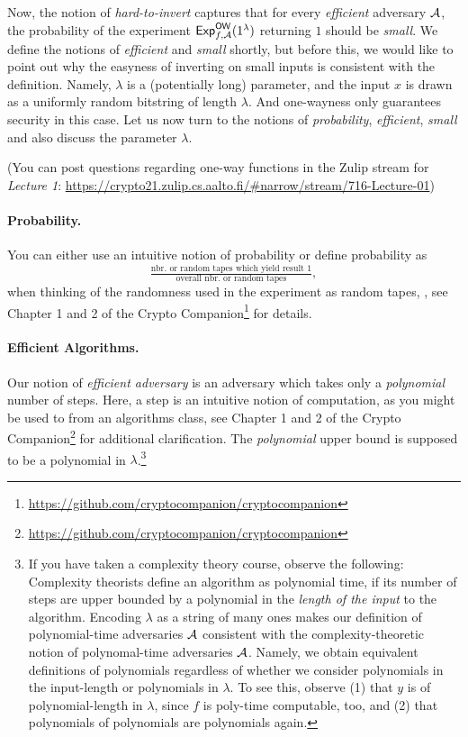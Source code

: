 \documentclass[a4paper,table,dvipsnames]{article}
\theoremstyle{definition}
\begin{document}
Now, the notion of \emph{hard-to-invert} captures that for every \emph{efficient} adversary $\mathcal{A}$, the probability of the experiment ${\sf{Exp}}_{f,\mathcal{A}}^{\sf{OW}}(1^\lambda)$ returning $1$ should be \emph{small}. We define the notions of \emph{efficient} and \emph{small} shortly, but before this, we would like to point out why the easyness of inverting on small inputs is consistent with the definition. Namely, $\lambda$ is a (potentially long) parameter, and the input $x$ is drawn as a uniformly random bitstring of length $\lambda$. And one-wayness only guarantees security in this case. Let us now turn to the notions of \emph{probability}, \emph{efficient}, \emph{small} and also discuss the parameter $\lambda$.

\medskip
\small
(You can post questions regarding one-way functions in the Zulip stream for \emph{Lecture 1}: \url{https://crypto21.zulip.cs.aalto.fi/#narrow/stream/716-Lecture-01})

\normalsize
\paragraph{Probability.} You can either use an intuitive notion of probability or define probability as 
\[\tfrac{\text{nbr. or random tapes which yield result 1}}{\text{overall nbr. or random tapes}},\] 
when thinking of the randomness used in the experiment as random tapes, , see Chapter 1 and 2 of the Crypto Companion\footnote{\url{https://github.com/cryptocompanion/cryptocompanion}} for details. 

\paragraph{Efficient Algorithms.} Our notion of \emph{efficient adversary} is an adversary which takes only a \emph{polynomial} number of steps. Here, a step is an intuitive notion of computation, as you might be used to from an algorithms class, see Chapter 1 and 2 of the Crypto Companion\footnote{\url{https://github.com/cryptocompanion/cryptocompanion}} for additional clarification. The \emph{polynomial} upper bound is supposed to be a polynomial in $\lambda$.\footnote{If you have taken a complexity theory course, observe the following: Complexity theorists define an algorithm as polynomial time, if its number of steps are upper bounded by a polynomial in the \emph{length of the input} to the algorithm. Encoding $\lambda$ as a string of many ones makes our definition of polynomial-time adversaries $\mathcal{A}$ consistent with the complexity-theoretic notion of polynomal-time adversaries $\mathcal{A}$.
Namely, we obtain equivalent definitions of polynomials regardless of whether we consider polynomials in the input-length or polynomials in $\lambda$. To see this, observe (1) that $y$ is of polynomial-length in $\lambda$, since $f$ is poly-time computable, too, and (2) that polynomials of polynomials are polynomials again.} 
\end{document}

